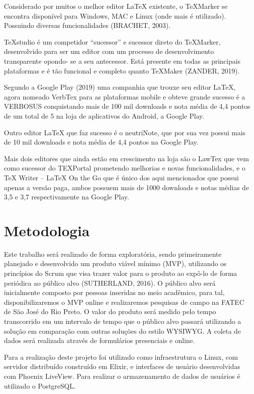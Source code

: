 \documentclass[article,12pt,oneside,a4paper,english,brazil,sumario=tradicional]{abntex2}
\begin{document}
Considerado por muitos o melhor editor LaTeX existente, o TeXMarker se encontra disponível para Windows, MAC e Linux (onde mais é utilizado). Possuindo diversas funcionalidades (BRACHET, 2003).

TeXstudio é um competidor “sucessor” e sucessor direto do TeXMarker, desenvolvido para ser um editor com um processo de desenvolvimento transparente opondo- se a seu antecessor. Está presente em todas as principais plataformas e é tão funcional e completo quanto TeXMaker (ZANDER, 2019).

Segundo a Google Play (2019) uma companhia que trouxe seu editor LaTeX, agora nomeado VerbTex para as plataformas mobile e obteve grande sucesso é a VERBOSUS conquistando mais de 100 mil downloads e nota média de 4,4 pontos de um total de 5 na loja de aplicativos do Android, a Google Play.

Outro editor LaTeX que faz sucesso é o neutriNote, que por sua vez possui mais de 10 mil downloads e nota média de 4,4 pontos na Google Play.

Mais dois editores que ainda estão em crescimento na loja são o LawTex que vem como sucessor do TEXPortal prometendo melhorias e novas funcionalidades, e o TeX Writer – LaTeX On the Go que é único dos aqui mencionados que possui apenas a versão paga, ambos possuem mais de 1000 downloads e notas médias de 3,5 e 3,7 respectivamente na Google Play.





\section{Metodologia}

Este trabalho será realizado de forma exploratória, sendo primeiramente planejado e desenvolvido um produto viável mínimo (MVP), utilizando os princípios do Scrum que visa trazer valor para o produto ao expô-lo de forma periódica ao público alvo (SUTHERLAND, 2016). O público alvo será inicialmente composto por pessoas inseridas no meio acadêmico, para tal, disponibilizaremos o MVP online e realizaremos pesquisas de campo na FATEC de São José do Rio Preto. O valor do produto será medido pelo tempo transcorrido em um intervalo de tempo que o público alvo passará utilizando a solução em comparação com outras soluções do estilo WYSIWYG. A coleta de dados será realizada através de formulários presenciais e online.

Para a realização deste projeto foi utilizado como infraestrutura o Linux, com servidor distribuído construído em Elixir, e interfaces de usuário desenvolvidas com Phoenix LiveView. Para realizar o armazenamento de dados de usuários é utilizado o PostgreSQL.
\end{document}
